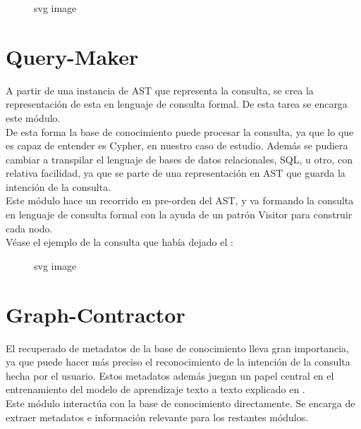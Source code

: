 \begin{figure}[htbp]
  \centering
  
  \caption{svg image}
\end{figure}



\section{Query-Maker}
\label{query-m}
A partir de una instancia de AST que representa la consulta, se crea la representaci\'on de esta en lenguaje de consulta formal. De esta tarea se encarga este m\'odulo.\\

De esta forma la base de conocimiento puede procesar la consulta, ya que lo que es capaz de entender es Cypher, en nuestro caso de estudio. Adem\'as se pudiera cambiar a transpilar el lenguaje de bases de datos relacionales, SQL, u otro, con relativa facilidad, ya que se parte de una representaci\'on en AST que guarda la intenci\'on de la consulta.\\

Este m\'odulo hace un recorrido en pre-orden del AST, y va formando la consulta en lenguaje de consulta formal con la ayuda de un patr\'on Visitor para construir cada nodo.\\

V\'ease el ejemplo de la consulta que hab\'ia dejado el :\\

\begin{figure}[htbp]
  \centering
  
  \caption{svg image}
\end{figure}



\section{Graph-Contractor}
\label{graphc}
El recuperado de metadatos de la base de conocimiento lleva gran importancia, ya que puede hacer más preciso el reconocimiento de la intención de la consulta hecha por el usuario. Estos metadatos adem\'as juegan un papel central en el entrenamiento del modelo de aprendizaje texto a texto explicado en .\\

Este módulo interact\'ua con la base de conocimiento directamente. Se encarga de extraer metadatos e informaci\'on relevante para los restantes m\'odulos.\\
    
